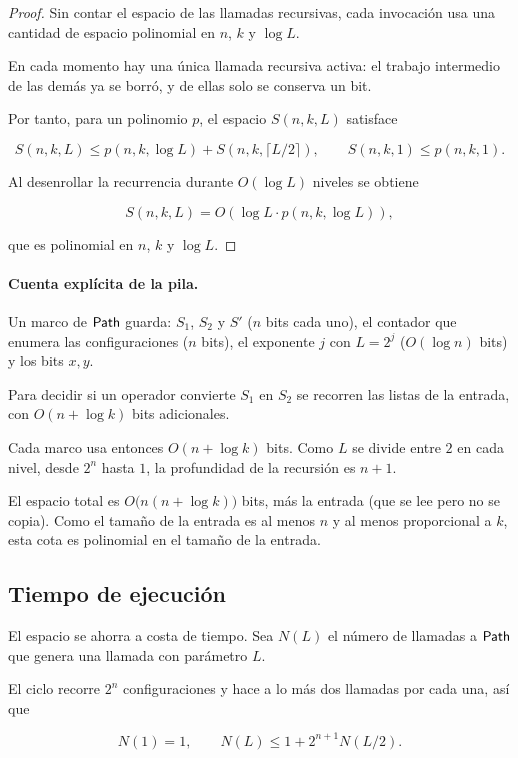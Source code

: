 \documentclass[11pt,letterpaper]{article}
\theoremstyle{plain}
\theoremstyle{definition}
\theoremstyle{remark}
\newcommand{\nombreMat}[1]{\ensuremath{\text{\fontencoding{OT1}\fontfamily{cmss}\upshape\selectfont #1}}}
\newcommand{\Path}{\nombreMat{Path}}
\begin{document}
\begin{proof}
Sin contar el espacio de las llamadas recursivas,
cada invocación usa una cantidad de espacio
polinomial en $n$, $k$ y $\log L$.

En cada momento hay una única llamada recursiva
activa: el trabajo intermedio de las demás ya se
borró, y de ellas solo se conserva un bit.

Por tanto, para un polinomio $p$, el espacio
$S(n,k,L)$ satisface

\[
S(n,k,L)\le
p(n,k,\log L)+S(n,k,\lceil L/2\rceil),
\qquad
S(n,k,1)\le p(n,k,1).
\]

Al desenrollar la recurrencia durante
$O(\log L)$ niveles se obtiene

\[
S(n,k,L)=O(\log L\cdot p(n,k,\log L)),
\]

que es polinomial en $n$, $k$ y $\log L$.
\end{proof}

\paragraph{Cuenta explícita de la pila.}
Un marco de $\Path$ guarda:
$S_1$, $S_2$ y $S'$ ($n$ bits cada uno),
el contador que enumera las configuraciones
($n$ bits), el exponente $j$ con $L=2^{j}$
($O(\log n)$ bits) y los bits $x,y$.

Para decidir si un operador convierte
$S_1$ en $S_2$ se recorren las listas de
la entrada, con $O(n+\log k)$ bits adicionales.

Cada marco usa entonces $O(n+\log k)$ bits.
Como $L$ se divide entre $2$ en cada nivel,
desde $2^{n}$ hasta $1$, la profundidad
de la recursión es $n+1$.

El espacio total es
$O\bigl(n(n+\log k)\bigr)$ bits,
más la entrada (que se lee pero no se copia).
Como el tamaño de la entrada
es al menos $n$ y al menos proporcional a $k$,
esta cota es polinomial en el tamaño de la entrada.

\subsection{Tiempo de ejecución}

El espacio se ahorra a costa de tiempo.
Sea $N(L)$ el número de llamadas a $\Path$
que genera una llamada con parámetro $L$.

El ciclo recorre $2^{n}$ configuraciones
y hace a lo más dos llamadas por cada una, así que

\[
N(1)=1,\qquad
N(L)\le 1+2^{n+1}N(L/2).
\]
\end{document}
